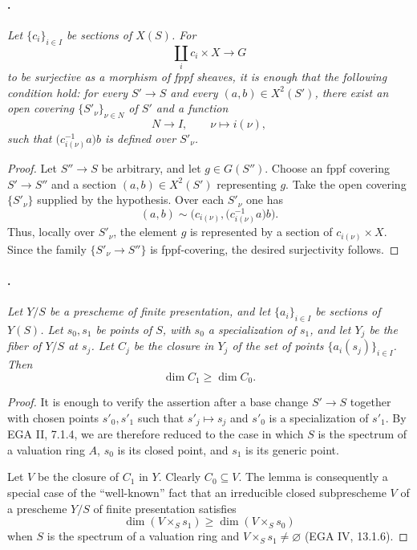 \paragraph{.}
\textit{Let \(\{c_i\}_{i\in I}\) be sections of \(X(S)\). For
\[
  \coprod_i c_i\times X\longrightarrow G
\]
to be surjective as a morphism of fppf sheaves, it is enough that
the following condition hold: for every \(S'\to S\) and every
\((a,b)\in X^2(S')\), there exist an open covering
\(\{S'_\nu\}_{\nu\in N}\) of \(S'\) and a function
\[
  N\longrightarrow I,\qquad \nu\longmapsto i(\nu),
\]
such that \(\bigl(c_{i(\nu)}^{-1}a\bigr)b\) is defined over
\(S'_\nu\).}

\begin{proof}
Let \(S''\to S\) be arbitrary, and let \(g\in G(S'')\). Choose
an fppf covering \(S'\to S''\) and a section
\((a,b)\in X^2(S')\) representing \(g\). Take the open covering
\(\{S'_\nu\}\) supplied by the hypothesis. Over each \(S'_\nu\)
one has
\[
  (a,b)\sim
  \bigl(c_{i(\nu)},\bigl(c_{i(\nu)}^{-1}a\bigr)b\bigr).
\]
Thus, locally over \(S'_\nu\), the element \(g\) is represented
by a section of \(c_{i(\nu)}\times X\). Since the family
\(\{S'_\nu\to S''\}\) is fppf-covering, the desired surjectivity
follows.
\end{proof}

\paragraph{.}
\textit{Let \(Y/S\) be a prescheme of finite presentation, and
let \(\{a_i\}_{i\in I}\) be sections of \(Y(S)\). Let
\(s_0,s_1\) be points of \(S\), with \(s_0\) a specialization of
\(s_1\), and let \(Y_j\) be the fiber of \(Y/S\) at \(s_j\).
Let \(C_j\) be the closure in \(Y_j\) of the set of points
\(\{a_i(s_j)\}_{i\in I}\). Then
\[
  \dim C_1\geq \dim C_0.
\]}

\begin{proof}
It is enough to verify the assertion after a base change
\(S'\to S\) together with chosen points \(s'_0,s'_1\) such that
\(s'_j\mapsto s_j\) and \(s'_0\) is a specialization of
\(s'_1\). By EGA II, 7.1.4, we are therefore reduced to the case
in which \(S\) is the spectrum of a valuation ring \(A\),
\(s_0\) is its closed point, and \(s_1\) is its generic point.

Let \(V\) be the closure of \(C_1\) in \(Y\). Clearly
\(C_0\subseteq V\). The lemma is consequently a special case of
the ``well-known'' fact that an irreducible closed subprescheme
\(V\) of a prescheme \(Y/S\) of finite presentation satisfies
\[
  \dim(V\times_S s_1)\geq \dim(V\times_S s_0)
\]
when \(S\) is the spectrum of a valuation ring and
\(V\times_S s_1\neq\varnothing\) (EGA IV, 13.1.6).
\end{proof}

